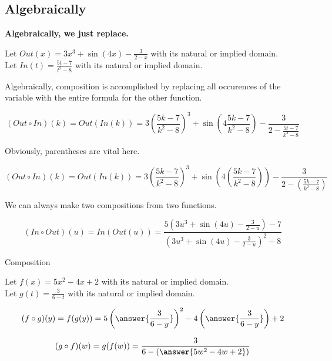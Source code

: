 \documentclass{ximera}
\begin{document}
\subsection*{Algebraically}




\textbf{\textcolor{purple!85!blue}{Algebraically, we just replace.}}







Let $Out(x) = 3x^3 + \sin(4x) - \frac{3}{2-x}$ with its natural or implied domain. \\
Let $In(t) = \frac{5t-7}{t^2-8}$ with its natural or implied domain. 



Algebraically, composition is accomplished by replacing all occurences of the variable with the entire formula for the other function.




\[
(Out \circ In)(k) = Out(In(k)) = 3 \left( \frac{5k-7}{k^2-8} \right)^3 + \sin(4 \frac{5k-7}{k^2-8}) - \frac{3}{2-\frac{5t-7}{k^2-8}}
\]





Obviously, parentheses are vital here.





\[
(Out \circ In)(k) = Out(In(k)) = 3 \left( \frac{5k-7}{k^2-8} \right)^3 + \sin\left( 4 \left( \frac{5k-7}{k^2-8} \right) \right) - \frac{3}{2 - \left( \frac{5k-7}{k^2-8} \right)}
\]






We can always make two compositions from two functions.




\[
(In \circ Out)(u) = In(Out(u)) = \frac{5 \left( 3u^3 + \sin(4u) - \frac{3}{2-u} \right)-7}{\left( 3u^3 + \sin(4u) - \frac{3}{2-u} \right)^2-8}
\]





\begin{example} Composition 



Let $f(x) = 5x^2 - 4x + 2$ with its natural or implied domain. \\
Let $g(t) = \frac{3}{6-t}$ with its natural or implied domain. 



\[
(f \circ g)(y) = f(g(y)) = 5 \left( \answer{\frac{3}{6-y}} \right)^2 - 4 \left( \answer{\frac{3}{6-y}} \right) + 2
\]





\[
(g \circ f)(w) = g(f(w)) = \frac{3}{6 - \left( \answer{5w^2 - 4w + 2} \right)}
\]



\end{example}
\end{document}
